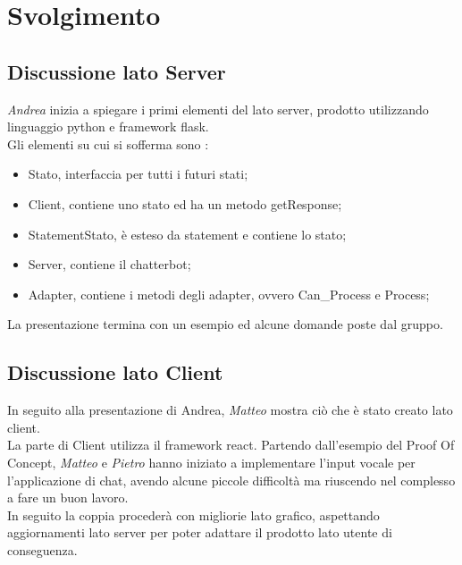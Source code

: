 \section{Svolgimento}
\subsection{Discussione lato Server}
\textit{Andrea} inizia a spiegare i primi elementi del lato server, prodotto utilizzando linguaggio python e framework flask.\\
Gli elementi su cui si sofferma sono : 
\begin{itemize}
  \item Stato, interfaccia per tutti i futuri stati;
  \item Client, contiene uno stato ed ha un metodo getResponse;
  \item StatementStato, è esteso da statement e contiene lo stato;
  \item Server, contiene il chatterbot;
  \item Adapter, contiene i metodi degli adapter, ovvero Can\_Process e Process;
\end{itemize}
La presentazione termina con un esempio ed alcune domande poste dal gruppo.

\subsection{Discussione lato Client}
In seguito alla presentazione di Andrea, \textit{Matteo} mostra ciò che è stato creato lato client. \\
La parte di Client utilizza il framework react. Partendo dall'esempio del Proof Of Concept, \textit{Matteo} e \textit{Pietro}
hanno iniziato a implementare l'input vocale per l'applicazione di chat, avendo alcune piccole difficoltà ma riuscendo nel complesso a fare un buon lavoro. \\
In seguito la coppia procederà con migliorie lato grafico, aspettando aggiornamenti lato server per poter adattare il prodotto lato utente di conseguenza.

